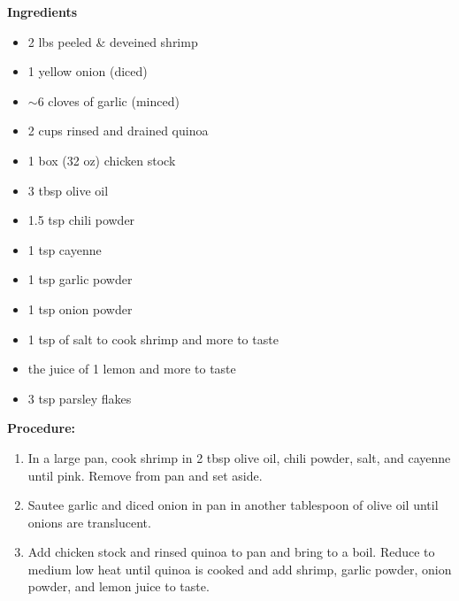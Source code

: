 \begin{multicols}{2}
\textbf{Ingredients}
\begin{itemize}
\item 2 lbs peeled \& deveined shrimp 
\item 1 yellow onion (diced)
\item $\sim 6$ cloves of garlic (minced)
\item 2 cups rinsed and drained quinoa
\item 1 box (32 oz) chicken stock
\item 3 tbsp olive oil  
\item 1.5 tsp chili powder
\item 1 tsp cayenne 
\item 1 tsp garlic powder
\item 1 tsp onion powder 
\item 1 tsp of salt to cook shrimp and more to taste
\item the juice of 1 lemon and more to taste 
\item 3 tsp parsley flakes 





\end{itemize}


\columnbreak
\textbf{Procedure:}
\medskip


\begin{enumerate}
\item In a large pan, cook shrimp in 2 tbsp olive oil, chili powder, salt, and cayenne until pink. Remove from pan and set aside. 

\medskip \item Sautee garlic and diced onion in pan in another tablespoon of olive oil until onions are translucent. 



\medskip

\item Add chicken stock and rinsed quinoa to pan and bring to a boil. Reduce to medium low heat until quinoa is cooked and add shrimp, garlic powder, onion powder, and lemon juice to taste. 



 
\end{enumerate}

\end{multicols}



